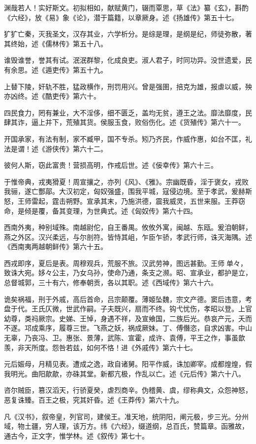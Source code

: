 \documentclass[12pt,UTF8]{ctexbook}
\begin{document}
渊哉若人！实好斯文。初拟相如，献赋黄门，辍而覃思，草《法》纂《玄》，斟酌《六经》，放《易》象《论》，潜于篇籍，以章厥身。述《扬雄传》第五十七。



犷犷亡秦，灭我圣文，汉存其业，六学析分。是综是理，是纲是纪，师徒弥散，著其终始，述《儒林传》第五十八。



谁毁谁誉，誉其有试。泯泯群黎，化成良吏。淑人君子，时同功异。没世遗爱，民有余思。述《遁吏传》第五十九。



上替下陵，奸轨不胜，猛政横作，刑罚用兴。曾是强圉，掊克为雄，报虐以威，殃亦凶终。述《酷吏传》第六十。



四民食力，罔有兼业，大不淫侈，细不匮乏，盖均无贫，遵王之法。靡法靡度，民肆其诈，逼上并下，荒殖其货。侯服玉食，败俗伤化。述《货殖传》第六十一。



开国承家，有法有制，家不臧甲，国不专杀。矧乃齐民，作威作惠，如台不匡，礼法是谓！述《游侠传》第六十二。



彼何人斯，窃此富贵！营损高明，作戒后世。述《佞幸传》第六十三。



于惟帝典，戎夷猾夏！周宣攘之，亦列《风》、《雅》。宗幽既昏，淫于褒女，戎败我骊，遂亡酆鄗。大汉初定，匈奴强盛，围我平城，寇侵边境。至于孝武，爰赫斯怒，王师雷起，霆击朔野。宣承其末，乃施洪德，震我威灵，五世来服。王莽窃命，是倾是覆，备其变理，为世典式。述《匈奴传》第六十四。



西南外夷，种别域殊。南越尉佗，自王番禺。攸攸外寓，闽越、东瓯。爰洎朝鲜，燕之外区。汉兴柔远，与尔剖符。皆恃其岨，乍臣乍骄，孝武行师，诛灭海隅。述《西南夷两越朝鲜传》第六十五。



西戎即序，夏后是表。周穆观兵，荒服不旅。汉武劳神，图远甚勤。王师单々，致诛大宛。姼々公主，乃女乌孙，使命乃通，条支之濒。昭、宣承业，都护是立，总督城郭，三十有六，修奉朝贡，各以其职。述《西域传》第六十六。



诡矣祸福，刑于外戚，高后首命，吕宗颠覆。薄姬坠魏，宗文产德。窦后违意，考盘于代。王氏仄微，世武作嗣。子夫既兴，扇而不终。钩弋忧伤，孝昭以登。上官幼尊，类祃厥宗。史娣、王悼，身遇不祥，及宣飨国，二族后光。恭哀产元，夭而不遂。邛成乘序，履尊三世。飞燕之妖，祸成厥妹。丁、傅僭恣，自求凶害。中山无辜，乃丧冯、卫。惠张、景薄，武陈、宣霍，成许、袁傅，平王之作，事虽歆羡，非天所度。怨咎若兹，如何不恪！进《外戚传》第六十七。



元后娠母，月精见表。遭成之逸，政自诸舅。阳平作威，诛加卿宰。成都煌煌，假我明光。曲阳歊歊，亦硃其堂。新都亢极，作乱以亡。述《元后传》第六十八。



咨尔贼臣，篡汉滔天，行骄夏癸，虐烈商辛。伪稽黄、虞，缪称典文，众怨神怒，恶复诛臻。百王之极，究其奸昏。述《王莽传》第六十九。



凡《汉书》，叙帝皇，列官司，建侯王。准天地，统阴阳，阐元极，步三光。分州域，物土疆，穷人理，该万方。纬《六经》，缀道纲，总百氏，赞篇章。函雅故，通古今，正文字，惟学林。述《叙传》第七十。

\backmatter
\end{document}
